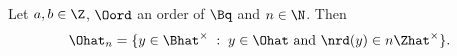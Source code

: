 Let $a,b\in\Z$, $\Oord$ an order of $\Bq$ and $n\in\N$. Then
\[
  \Ohat_n=\{y\in\Bhat^\times\;:\;y\in\Ohat\text{ and }\nrd(y)\in n\Zhat^\times\}.
\]
